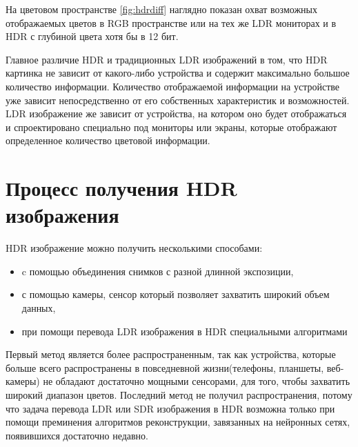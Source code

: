     На цветовом пространстве \ref{fig:hdrdiff} наглядно показан охват возможных отображаемых цветов в RGB пространстве или на тех же LDR мониторах и в HDR с глубиной цвета хотя бы в 12 бит.

\begin{figure}[ht!]
\end{figure}

    Главное различие HDR и традиционных LDR изображений в том, что HDR картинка не зависит от какого-либо устройства и содержит максимально большое количество информации. Количество отображаемой информации на устройстве уже зависит непосредственно от его собственных характеристик и возможностей. LDR изображение же зависит от устройства, на котором оно будет отображаться и спроектировано специально под мониторы или экраны, которые отображают определенное количество цветовой информации.

\section{ Процесс получения HDR изображения}

HDR изображение можно получить несколькими способами: 
\begin{itemize}
    \item c помощью объединения снимков с разной длинной экспозиции,
    \item с помощью камеры, сенсор который позволяет захватить широкий объем данных,
    \item при помощи перевода LDR изображения в HDR специальными алгоритмами
\end{itemize}

Первый метод является более распространенным, так как устройства, которые больше всего распространены в повседневной жизни(телефоны, планшеты, веб-камеры) не обладают достаточно мощными сенсорами, для того, чтобы захватить широкий диапазон цветов. Последний метод не получил распространения, потому что задача перевода LDR или SDR изображения в HDR возможна только при помощи преминения алгоритмов реконструкции, завязанных на нейронных сетях, появившихся достаточно недавно.

